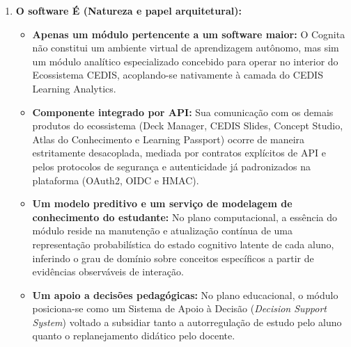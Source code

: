 \begin{enumerate}
    \item \textbf{O software É (Natureza e papel arquitetural):}
    \begin{itemize}
        \item \textbf{Apenas um módulo pertencente a um software maior:} O Cognita não constitui um ambiente virtual de aprendizagem autônomo, mas sim um módulo analítico especializado concebido para operar no interior do Ecossistema CEDIS, acoplando-se nativamente à camada do CEDIS Learning Analytics.
        \item \textbf{Componente integrado por API:} Sua comunicação com os demais produtos do ecossistema (Deck Manager, CEDIS Slides, Concept Studio, Atlas do Conhecimento e Learning Passport) ocorre de maneira estritamente desacoplada, mediada por contratos explícitos de API e pelos protocolos de segurança e autenticidade já padronizados na plataforma (OAuth2, OIDC e HMAC).
        \item \textbf{Um modelo preditivo e um serviço de modelagem de conhecimento do estudante:} No plano computacional, a essência do módulo reside na manutenção e atualização contínua de uma representação probabilística do estado cognitivo latente de cada aluno, inferindo o grau de domínio sobre conceitos específicos a partir de evidências observáveis de interação.
        \item \textbf{Um apoio a decisões pedagógicas:} No plano educacional, o módulo posiciona-se como um Sistema de Apoio à Decisão (\textit{Decision Support System}) voltado a subsidiar tanto a autorregulação de estudo pelo aluno quanto o replanejamento didático pelo docente.
    \end{itemize}


\end{enumerate}
